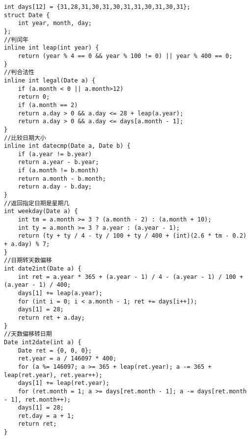 \documentclass[a4paper,landscape,twocolumn]{ctexart}
\begin{document}
\begin{lstlisting}
int days[12] = {31,28,31,30,31,30,31,31,30,31,30,31};
struct Date {
	int year, month, day;
};
//判闰年
inline int leap(int year) {
	return (year % 4 == 0 && year % 100 != 0) || year % 400 == 0;
}
//判合法性
inline int legal(Date a) {
	if (a.month < 0 || a.month>12)
	return 0;
	if (a.month == 2)
	return a.day > 0 && a.day <= 28 + leap(a.year);
	return a.day > 0 && a.day <= days[a.month - 1];
}
//比较日期大小
inline int datecmp(Date a, Date b) {
	if (a.year != b.year)
	return a.year - b.year;
	if (a.month != b.month)
	return a.month - b.month;
	return a.day - b.day;
}
//返回指定日期是星期几
int weekday(Date a) {
	int tm = a.month >= 3 ? (a.month - 2) : (a.month + 10);
	int ty = a.month >= 3 ? a.year : (a.year - 1);
	return (ty + ty / 4 - ty / 100 + ty / 400 + (int)(2.6 * tm - 0.2) + a.day) % 7;
}
//日期转天数偏移
int date2int(Date a) {
	int ret = a.year * 365 + (a.year - 1) / 4 - (a.year - 1) / 100 + (a.year - 1) / 400;
	days[1] += leap(a.year);
	for (int i = 0; i < a.month - 1; ret += days[i++]);
	days[1] = 28;
	return ret + a.day;
}
//天数偏移转日期
Date int2date(int a) {
	Date ret = {0, 0, 0};
	ret.year = a / 146097 * 400;
	for (a %= 146097; a >= 365 + leap(ret.year); a -= 365 + leap(ret.year), ret.year++);
	days[1] += leap(ret.year);
	for (ret.month = 1; a >= days[ret.month - 1]; a -= days[ret.month - 1], ret.month++);
	days[1] = 28;
	ret.day = a + 1;
	return ret;
}
\end{lstlisting}
\end{document}
